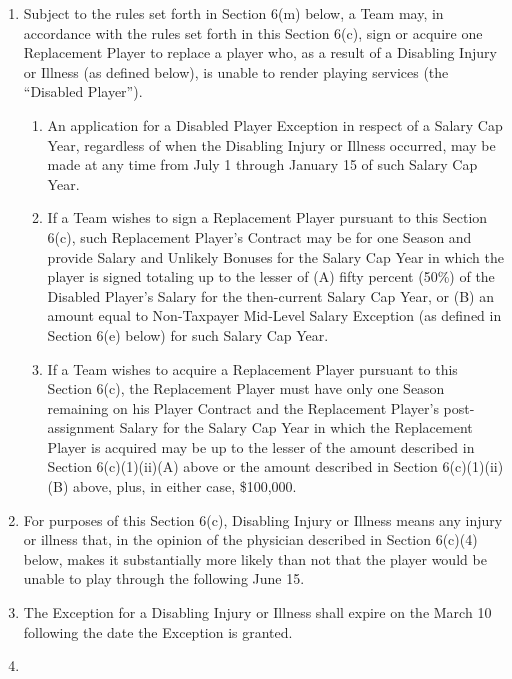 \documentclass[
]{book}
\providecommand{\tightlist}{%
  \setlength{\itemsep}{0pt}\setlength{\parskip}{0pt}}
\begin{document}
\begin{enumerate}
  \begin{enumerate}
  \def\labelenumii{(\arabic{enumii})}
  \tightlist
  \item
    Subject to the rules set forth in Section 6(m) below, a Team may, in accordance with the rules set forth in this Section 6(c), sign or acquire one Replacement Player to replace a player who, as a result of a Disabling Injury or Illness (as defined below), is unable to render playing services (the ``Disabled Player'').

    \begin{enumerate}
    \def\labelenumiii{(\roman{enumiii})}
    \tightlist
    \item
      An application for a Disabled Player Exception in respect of a Salary Cap Year, regardless of when the Disabling Injury or Illness occurred, may be made at any time from July 1 through January 15 of such Salary Cap Year.
    \item
      If a Team wishes to sign a Replacement Player pursuant to this Section 6(c), such Replacement Player's Contract may be for one Season and provide Salary and Unlikely Bonuses for the Salary Cap Year in which the player is signed totaling up to the lesser of (A) fifty percent (50\%) of the Disabled Player's Salary for the then-current Salary Cap Year, or (B) an amount equal to Non-Taxpayer Mid-Level Salary Exception (as defined in Section 6(e) below) for such Salary Cap Year.
    \item
      If a Team wishes to acquire a Replacement Player pursuant to this Section 6(c), the Replacement Player must have only one Season remaining on his Player Contract and the Replacement Player's post-assignment Salary for the Salary Cap Year in which the Replacement Player is acquired may be up to the lesser of the amount described in Section 6(c)(1)(ii)(A) above or the amount described in Section 6(c)(1)(ii)(B) above, plus, in either case, \$100,000.
    \end{enumerate}
  \item
    For purposes of this Section 6(c), Disabling Injury or Illness means any injury or illness that, in the opinion of the physician described in Section 6(c)(4) below, makes it substantially more likely than not that the player would be unable to play through the following June 15.
  \item
    The Exception for a Disabling Injury or Illness shall expire on the March 10 following the date the Exception is granted.
  \item

\end{enumerate}
\end{enumerate}
\end{document}
